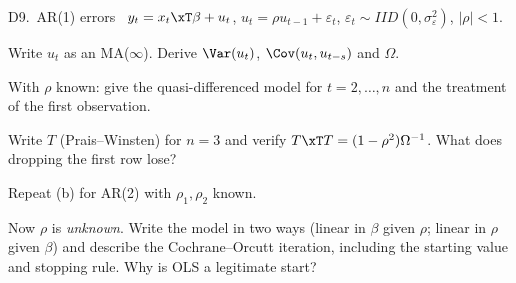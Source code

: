 \begin{qbox}{D9.\ AR(1) errors}{\must\ \newtag}
$y_{t}=x_{t}\xT\beta+u_{t}$, $u_{t}=\rho u_{t-1}+\varepsilon_{t}$, $\varepsilon_{t}\sim IID(0,\sigma_{\varepsilon}^{2})$, $|\rho|<1$.
\begin{flatlist}
  \item[(a)] Write $u_{t}$ as an MA($\infty$). Derive $\Var(u_{t})$, $\Cov(u_{t},u_{t-s})$ and $\Omega$.
  \item[(b)] With $\rho$ known: give the quasi-differenced model for $t=2,\dots,n$ and the treatment of the first observation.
  \item[(c)] Write $T$ (Prais--Winsten) for $n=3$ and verify $T\xT T=(1-\rho^{2})\Omega^{-1}$. What does dropping the first row lose?
  \item[(d)] Repeat (b) for AR(2) with $\rho_{1},\rho_{2}$ known.
  \item[(e)] Now $\rho$ is \emph{unknown}. Write the model in two ways (linear in $\beta$ given $\rho$; linear in $\rho$ given $\beta$) and describe
        the Cochrane--Orcutt iteration, including the starting value and stopping rule. Why is OLS a legitimate start?
\end{flatlist}
\end{qbox}
